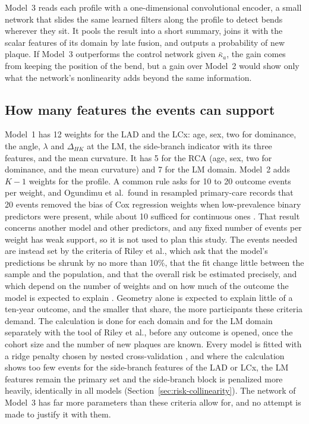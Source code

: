 Model~3 reads each profile with a one-dimensional convolutional encoder, a small network that slides the same learned filters along the profile to detect bends wherever they sit.
It pools the result into a short summary, joins it with the scalar features of its domain by late fusion, and outputs a probability of new plaque.
If Model~3 outperforms the control network given $\bar\kappa_a$, the gain comes from keeping the position of the bend, but a gain over Model~2 would show only what the network's nonlinearity adds beyond the same information.

\subsection{How many features the events can support}

Model~1 has 12 weights for the LAD and the LCx: age, sex, two for dominance, the angle, $\lambda$ and $\Delta_{HK}$ at the LM, the side-branch indicator with its three features, and the mean curvature.
It has 5 for the RCA (age, sex, two for dominance, and the mean curvature) and 7 for the LM domain.
Model~2 adds $K - 1$ weights for the profile.
A common rule asks for 10 to 20 outcome events per weight, and Ogundimu et al.\ found in resampled primary-care records that 20 events removed the bias of Cox regression weights when low-prevalence binary predictors were present, while about 10 sufficed for continuous ones \cite{ogundimu2016epv}.
That result concerns another model and other predictors, and any fixed number of events per weight has weak support, so it is not used to plan this study.
The events needed are instead set by the criteria of Riley et al., which ask that the model's predictions be shrunk by no more than 10\%, that the fit change little between the sample and the population, and that the overall risk be estimated precisely, and which depend on the number of weights and on how much of the outcome the model is expected to explain \cite{riley2020samplesize}.
Geometry alone is expected to explain little of a ten-year outcome, and the smaller that share, the more participants these criteria demand.
The calculation is done for each domain and for the LM domain separately with the tool of Riley et al., before any outcome is opened, once the cohort size and the number of new plaques are known.
Every model is fitted with a ridge penalty chosen by nested cross-validation \cite{pavlou2015fewevents}, and where the calculation shows too few events for the side-branch features of the LAD or LCx, the LM features remain the primary set and the side-branch block is penalized more heavily, identically in all models (Section~\ref{sec:risk-collinearity}).
The network of Model~3 has far more parameters than these criteria allow for, and no attempt is made to justify it with them.

